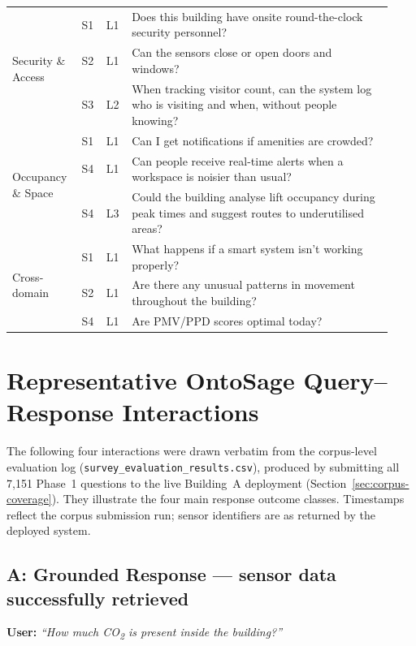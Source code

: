 \documentclass[acmsmall]{acmart}
\begin{document}
\begin{table}[t]
\begin{tabular}{@{}p{0.16\linewidth}p{0.06\linewidth}p{0.06\linewidth}p{0.65\linewidth}@{}}
\midrule
\multirow{3}{*}{Security \& Access}
  & S1 & L1 & Does this building have onsite round-the-clock security personnel? \\
  & S2 & L1 & Can the sensors close or open doors and windows? \\
  & S3 & L2 & When tracking visitor count, can the system log who is visiting and when, without people knowing? \\
\midrule
\multirow{3}{*}{Occupancy \& Space}
  & S1 & L1 & Can I get notifications if amenities are crowded? \\
  & S4 & L1 & Can people receive real-time alerts when a workspace is noisier than usual? \\
  & S4 & L3 & Could the building analyse lift occupancy during peak times and suggest routes to underutilised areas? \\
\midrule
\multirow{3}{*}{Cross-domain}
  & S1 & L1 & What happens if a smart system isn't working properly? \\
  & S2 & L1 & Are there any unusual patterns in movement throughout the building? \\
  & S4 & L1 & Are PMV/PPD scores optimal today? \\
\bottomrule
\end{tabular}
\end{table}

\section{Representative OntoSage Query--Response Interactions}
\label{app:interactions}

The following four interactions were drawn verbatim from the corpus-level evaluation log (\texttt{survey\_evaluation\_results.csv}), produced by submitting all 7{,}151 Phase~1 questions to the live Building~A deployment (Section~\ref{sec:corpus-coverage}). They illustrate the four main response outcome classes. Timestamps reflect the corpus submission run; sensor identifiers are as returned by the deployed system.

\subsection*{A: Grounded Response --- sensor data successfully retrieved}

\noindent\textbf{User:} \emph{``How much CO\textsubscript{2} is present inside the building?''}
\end{document}
